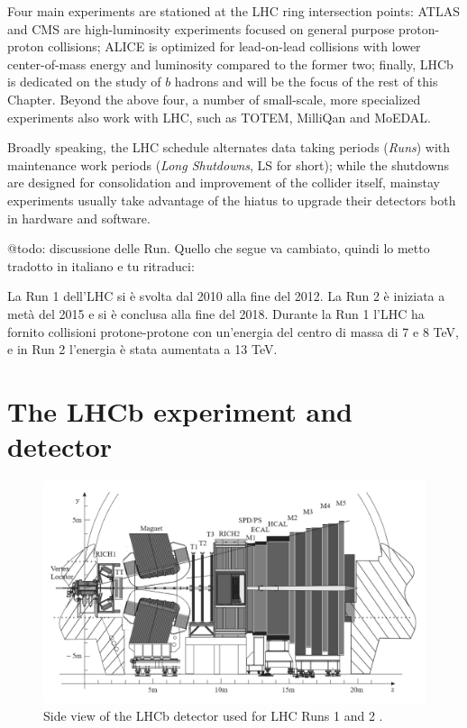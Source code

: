 Four main experiments are stationed at the LHC ring intersection points:
ATLAS and CMS are high-luminosity experiments focused on general purpose proton-proton collisions; ALICE is optimized for lead-on-lead collisions with lower center-of-mass energy and luminosity compared to the former two; finally, LHCb is dedicated on the study of $b$ hadrons and will be the focus of the rest of this Chapter.
Beyond the above four, a number of small-scale, more specialized experiments also work with LHC, such as TOTEM, MilliQan and MoEDAL.

Broadly speaking, the LHC schedule alternates data taking periods (\textit{Runs}) with maintenance work periods (\textit{Long Shutdowns}, LS for short);
while the shutdowns are designed for consolidation and improvement of the collider itself, mainstay experiments usually take advantage of the hiatus to upgrade their detectors both in hardware and software.

@todo: discussione delle Run. Quello che segue va cambiato, quindi lo metto tradotto in italiano e tu ritraduci:

La Run 1 dell'LHC si è svolta dal 2010 alla fine del 2012. La Run 2 è iniziata a metà del 2015 e si è conclusa alla fine del 2018. Durante la Run 1 l'LHC ha fornito collisioni protone-protone con un'energia del centro di massa di 7 e 8 TeV, e in Run 2 l'energia è stata aumentata a 13 TeV.


\section{The LHCb experiment and detector}

\begin{figure}[t]
	\centering
	\includegraphics[width=\textwidth]{graphics/02-lhcb/lhcb_diagram.png}
	\caption[LHCb detector side view (Runs 1 and 2).]{Side view of the LHCb detector used for LHC Runs 1 and 2 \cite{Antunes-Nobrega:630827}.}
	\label{fig:2:lhcb_diagram}
\end{figure}

